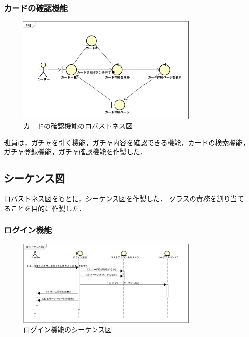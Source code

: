 \documentclass{ltjsarticle}
\begin{document}
\subsubsection{カードの確認機能}
\begin{figure}[H]
    \centering
    \includegraphics[width=0.8\textwidth]{src/cardRobustness.png}
    \caption{カードの確認機能のロバストネス図}
    \label{fig:robustnessCard}
\end{figure}

班員は，ガチャを引く機能，ガチャ内容を確認できる機能，カードの検索機能，ガチャ登録機能，ガチャ確認機能を作製した．

\subsection{シーケンス図}
ロバストネス図をもとに，シーケンス図を作製した．
クラスの責務を割り当てることを目的に作製した．

\subsubsection{ログイン機能}
\begin{figure}[H]
    \centering
    \includegraphics[width=0.8\textwidth]{src/loginSequence.png}
    \caption{ログイン機能のシーケンス図}
    \label{fig:sequenceLogin}
\end{figure}
\end{document}
